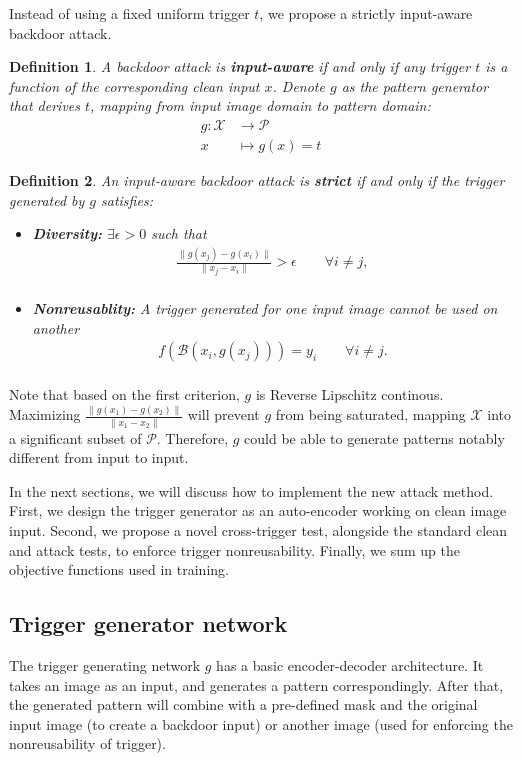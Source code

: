 \documentclass{article}
\newtheorem{definition}{Definition}
\begin{document}
Instead of using a fixed uniform trigger $t$, we propose a strictly input-aware backdoor attack.

\begin{definition}
A backdoor attack is \textbf{input-aware} if and only if any trigger $t$ is a function of the corresponding clean input $x$. Denote $g$ as the pattern generator that derives $t$, mapping from input image domain to pattern domain:
\begin{align*}
        g:\mathcal{X}&\longrightarrow\mathcal{P}\\
        x&\longmapsto g(x)=t
\end{align*}
\end{definition}

\begin{definition}
An input-aware backdoor attack is \textbf{strict} if and only if the trigger generated by $g$ satisfies:
\begin{itemize}
  \item \textbf{Diversity:}  $ \exists \epsilon > 0$ such that 
\begin{align*} 
\frac{\|g(x_j) - g(x_i)\|}{\|x_j - x_i\|} > \epsilon \quad\quad \forall i \neq j,\\
\end{align*}
\vspace{-12mm}
  \item \textbf{Nonreusablity:} A trigger generated for one input image cannot be used on another
\begin{align*}
f(\mathcal{B}(x_i,g(x_j))) = y_i \quad\quad \forall i \neq j.\\
\end{align*}
\end{itemize}
\end{definition}

Note that based on the first criterion, $g$ is Reverse Lipschitz continous. Maximizing $\frac{\|g(x_1)-g(x_2)\|}{\|x_1-x_2\|}$ will prevent $g$ from being saturated, mapping $\mathcal{X}$ into a significant subset of $\mathcal{P}$. Therefore, $g$ could be able to generate patterns notably different from input to input.

In the next sections, we will discuss how to implement the new attack method. First, we design the trigger generator as an auto-encoder working on clean image input. Second, we propose a novel cross-trigger test, alongside the standard clean and attack tests, to enforce trigger nonreusability. Finally, we sum up the objective functions used in training.
\subsection{Trigger generator network}
The trigger generating network $g$ has a basic encoder-decoder architecture. It takes an image as an input, and generates a pattern correspondingly. After that, the generated pattern will combine with a pre-defined mask and the original input image (to create a backdoor input) or another image (used for enforcing the nonreusability of trigger).
\end{document}

